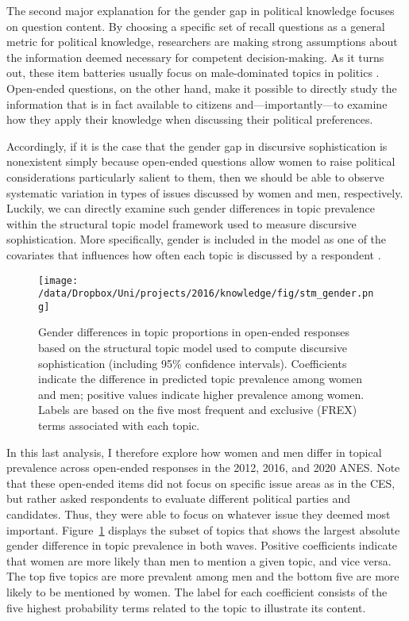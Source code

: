 
The second major explanation for the gender gap in political knowledge focuses on question content. By choosing a specific set of recall questions as a general metric for political knowledge, researchers are making strong assumptions about the information deemed necessary for competent decision-making. As it turns out, these item batteries usually focus on male-dominated topics in politics \citep{dolan2011women}. Open-ended questions, on the other hand, make it possible to directly study the information that is in fact available to citizens and---importantly---to examine how they apply their knowledge when discussing their political preferences.

Accordingly, if it is the case that the gender gap in discursive sophistication is nonexistent simply because open-ended questions allow women to raise political considerations particularly salient to them, then we should be able to observe systematic variation in types of issues discussed by women and men, respectively. Luckily, we can directly examine such gender differences in topic prevalence within the structural topic model framework used to measure discursive sophistication. More specifically, gender is included in the model as one of the covariates that influences how often each topic is discussed by a respondent \citep[see also][for details]{roberts2014structural}.

\begin{figure}[ht]\centering
\texttt{[image: /data/Dropbox/Uni/projects/2016/knowledge/fig/stm\_gender.png]}
\caption[Gender differences in topic proprtions in open-ended responses]{Gender differences in topic proportions in open-ended responses based on the structural topic model used to compute discursive sophistication (including 95\% confidence intervals). Coefficients indicate the difference in predicted topic prevalence among women and men; positive values indicate higher prevalence among women. Labels are based on the five most frequent and exclusive (FREX) terms associated with each topic.
}\label{fig:stm_gender}
\end{figure}

In this last analysis, I therefore explore how women and men differ in topical prevalence across open-ended responses in the 2012, 2016, and 2020 ANES. Note that these open-ended items did not focus on specific issue areas as in the CES, but rather asked respondents to evaluate different political parties and candidates. Thus, they were able to focus on whatever issue they deemed most important. Figure~\ref{fig:stm_gender} displays the subset of topics that shows the largest absolute gender difference in topic prevalence in both waves. Positive coefficients indicate that women are more likely than men to mention a given topic, and vice versa. The top five topics are more prevalent among men and the bottom five are more likely to be mentioned by women. The label for each coefficient consists of the five highest probability terms related to the topic to illustrate its content.

